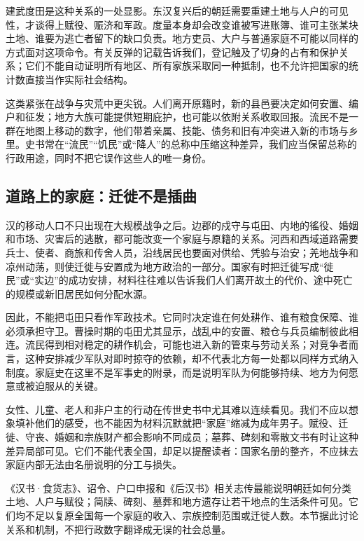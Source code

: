 建武度田是这种关系的一处显影。东汉复兴后的朝廷需要重建土地与人户的可见性，才谈得上赋役、赈济和军政。度量本身却会改变谁被写进账簿、谁可主张某块土地、谁要为逃亡者留下的缺口负责。地方吏员、大户与普通家庭不可能以同样的方式面对这项命令。有关反弹的记载告诉我们，登记触及了切身的占有和保护关系；它们不能自动证明所有地区、所有家族采取同一种抵制，也不允许把国家的统计数直接当作实际社会结构。

这类紧张在战争与灾荒中更尖锐。人们离开原籍时，新的县邑要决定如何安置、编户和征发；地方大族可能提供短期庇护，也可能以依附关系收取回报。流民不是一群在地图上移动的数字，他们带着亲属、技能、债务和旧有冲突进入新的市场与乡里。史书常在“流民”“饥民”或“降人”的总称中压缩这种差异，我们应当保留总称的行政用途，同时不把它误作这些人的唯一身份。

\subsection{道路上的家庭：迁徙不是插曲}

汉的移动人口不只出现在大规模战争之后。边郡的戍守与屯田、内地的徭役、婚姻和市场、灾害后的逃散，都可能改变一个家庭与原籍的关系。河西和西域道路需要兵士、使者、商旅和传舍人员，沿线居民也要面对供给、凭验与治安；羌地战争和凉州动荡，则使迁徙与安置成为地方政治的一部分。国家有时把迁徙写成“徙民”或“实边”的成功安排，材料往往难以告诉我们人们离开故土的代价、途中死亡的规模或新旧居民如何分配水源。

因此，不能把屯田只看作军政技术。它同时决定谁在何处耕作、谁有粮食保障、谁必须承担守卫。曹操时期的屯田尤其显示，战乱中的安置、粮仓与兵员编制彼此相连。流民得到相对稳定的耕作机会，可能也进入新的管束与劳动关系；对竞争者而言，这种安排减少军队对即时掠夺的依赖，却不代表北方每一处都以同样方式纳入制度。家庭史在这里不是军事史的附录，而是说明军队为何能够持续、地方为何愿意或被迫服从的关键。

女性、儿童、老人和非户主的行动在传世史书中尤其难以连续看见。我们不应以想象填补他们的感受，也不能因为材料沉默就把“家庭”缩减为成年男子。赋役、迁徙、守丧、婚姻和宗族财产都会影响不同成员；墓葬、碑刻和零散文书有时让这种差异局部可见。它们不能代表全国，却足以提醒读者：国家名册的整齐，不应抹去家庭内部无法由名册说明的分工与损失。

\begin{sourcenote}[社会史的尺度]
《汉书·食货志》、诏令、户口申报和《后汉书》相关志传最能说明朝廷如何分类土地、人户与赋役；简牍、碑刻、墓葬和地方遗存让若干地点的生活条件可见。它们均不足以复原全国每一个家庭的收入、宗族控制范围或迁徙人数。本节据此讨论关系和机制，不把行政数字翻译成无误的社会总量。
\end{sourcenote}

